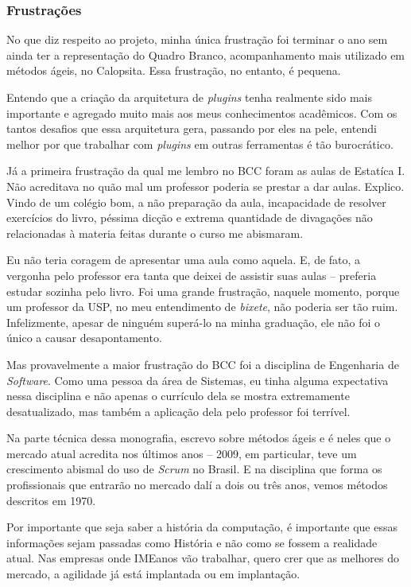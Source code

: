 \documentclass[titlepage,a4paper]{article}
\newcommand{\calopsita}{Calopsita}
\begin{document}
\subsubsection*{Frustrações}

No que diz respeito ao projeto, minha única frustração foi terminar o ano sem ainda ter a representação do Quadro Branco, acompanhamento mais utilizado em métodos ágeis, no \calopsita{}. Essa frustração, no entanto, é pequena.

Entendo que a criação da arquitetura de \textit{plugins} tenha realmente sido mais importante e agregado muito mais aos meus conhecimentos acadêmicos. Com os tantos desafios que essa arquitetura gera, passando por eles na pele, entendi melhor por que trabalhar com \textit{plugins} em outras ferramentas é tão burocrático. 

Já a primeira frustração da qual me lembro no BCC foram as aulas de Estatíca I. Não acreditava no quão mal um professor poderia se prestar a dar aulas. Explico. Vindo de um colégio bom, a não preparação da aula, incapacidade de resolver exercícios do livro, péssima dicção e extrema quantidade de divagações não relacionadas à materia feitas durante o curso me abismaram. 

Eu não teria coragem de apresentar uma aula como aquela. E, de fato, a vergonha pelo professor era tanta que deixei de assistir suas aulas -- preferia estudar sozinha pelo livro. Foi uma grande frustração, naquele momento, porque um professor da USP, no meu entendimento de \textit{bixete}, não poderia ser tão ruim. Infelizmente, apesar de ninguém superá-lo na minha graduação, ele não foi o único a causar desapontamento.

Mas provavelmente a maior frustração do BCC foi a disciplina de Engenharia de \textit{Software}. Como uma pessoa da área de Sistemas, eu tinha alguma expectativa nessa disciplina e não apenas o currículo dela se mostra extremamente desatualizado, mas também a aplicação dela pelo professor foi terrível.

Na parte técnica dessa monografia, escrevo sobre métodos ágeis e é neles que o mercado atual acredita nos últimos anos -- 2009, em particular, teve um crescimento abismal do uso de \textit{Scrum} no Brasil. E na disciplina que forma os profissionais que entrarão no mercado dalí a dois ou três anos, vemos métodos descritos em 1970.

Por importante que seja saber a história da computação, é importante que essas informações sejam passadas como História e não como se fossem a realidade atual. Nas empresas onde IMEanos vão trabalhar, quero crer que as melhores do mercado, a agilidade já está implantada ou em implantação.
\end{document}
